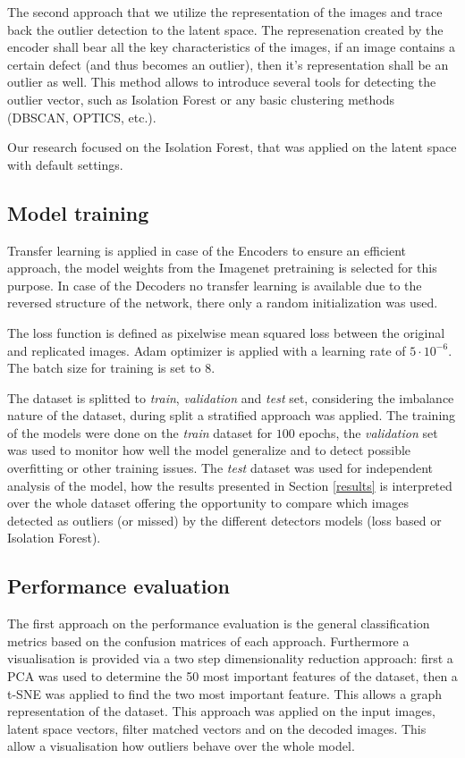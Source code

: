 The second approach that we utilize the representation of the images and trace back the outlier
detection to the latent space.
The represenation created by the encoder shall bear all the key characteristics of the images,
if an image contains a certain defect (and thus becomes an outlier), then it's representation
shall be an outlier as well.
This method allows to introduce several tools for detecting the outlier vector,
such as Isolation Forest or any basic clustering methods (DBSCAN, OPTICS, etc.).

Our research focused on the Isolation Forest, that was applied on the latent space with default
settings.

\subsection{Model training}
Transfer learning is applied in case of the Encoders to ensure an efficient approach,
the model weights from the Imagenet pretraining is selected for this purpose.
In case of the Decoders no transfer learning is available due to the reversed structure
of the network, there only a random initialization was used.

The loss function is defined as pixelwise mean squared loss between the original and replicated
images.
Adam optimizer is applied with a learning rate of $5 \cdot 10^{-6}$.
The batch size for training is set to 8.

The dataset is splitted to \emph{train}, \emph{validation} and \emph{test} set, considering the
imbalance nature of the dataset, during split a stratified approach was applied.
The training of the models were done on the \emph{train} dataset for $100$ epochs,
the \emph{validation} set was used to monitor how well the model generalize and to detect possible
overfitting or other training issues.
The \emph{test} dataset was used for independent analysis of the model, how the results presented
in Section \ref{results} is interpreted over the whole dataset offering the opportunity to compare
which images detected as outliers (or missed) by the different detectors models (loss based or
Isolation Forest).

\subsection{Performance evaluation}
The first approach on the performance evaluation is the general classification metrics based on
the confusion matrices of each approach.
Furthermore a visualisation is provided via a two step dimensionality reduction approach:
first a PCA was used to determine the 50 most important features of the dataset,
then a t-SNE was applied to find the two most important feature.
This allows a graph representation of the dataset.
This approach was applied on the input images, latent space vectors, filter matched vectors and on
the decoded images.
This allow a visualisation how outliers behave over the whole model.

